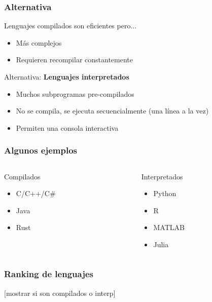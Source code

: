 \documentclass[14pt,aspectratio=169,xcolor=dvipsnames]{beamer}
\begin{document}
\begin{frame}\frametitle{Alternativa}
Lenguajes compilados son eficientes pero...
    \begin{itemize}
        \item Más complejos
        \item Requieren recompilar constantemente
    \end{itemize}

\vspace{1cm}
\pause Alternativa: \textbf{Lenguajes interpretados}

\pause
    \begin{itemize}
        \item Muchos subprogramas pre-compilados
        \item No se compila, se ejecuta secuencialmente (una línea a la vez)
        \item Permiten una consola interactiva
    \end{itemize}
\end{frame}
\begin{frame}\frametitle{Algunos ejemplos}
    \begin{columns}
        \begin{column}{0.45\textwidth}
            Compilados
            \begin{itemize}
                \item C/C++/C\#
                \item Java
                \item Rust
            \end{itemize}
        \end{column}

        \begin{column}{0.45\textwidth}
            Interpretados
            \begin{itemize}
                \item Python
                \item R
                \item MATLAB
                \item Julia
            \end{itemize}
        \end{column}
    \end{columns}
\end{frame}
\begin{frame}\frametitle{Ranking de lenguajes}
[mostrar si son compilados o interp]
\end{frame}
\end{document}
